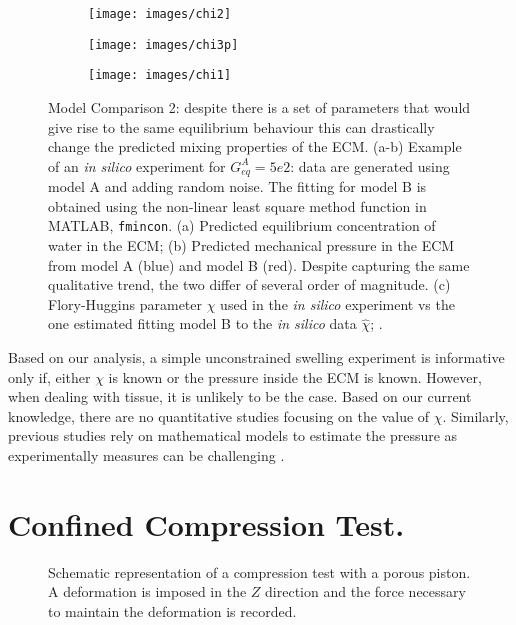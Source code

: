 \begin{figure}[h]
	\begin{subfigure}{0.49\textwidth}
		\centering
		\texttt{[image: images/chi2]}
		\caption{}
		\label{freeA}
	\end{subfigure}	
	\begin{subfigure}{0.49\textwidth}
		\centering
		\texttt{[image: images/chi3p]}
		\caption{}
		\label{freeB}
	\end{subfigure}	
	
	\centering
	\begin{subfigure}{0.6\textwidth}
		\texttt{[image: images/chi1]}
		\caption{}
		\label{freeC}
	\end{subfigure}
	\caption{Model Comparison 2: despite there is a set of parameters that would give rise to the same equilibrium behaviour this can drastically change the predicted mixing properties of the ECM. (a-b) Example of an \textit{in silico} experiment for $G^A_{eq}=5e2$: data are generated using model A and adding random noise. The fitting for model B is obtained using the non-linear least square method function in MATLAB, \texttt{fmincon}. (a) Predicted equilibrium concentration of water in the ECM; (b) Predicted mechanical pressure in the ECM from model A (blue) and model B (red). Despite capturing the same qualitative trend, the two differ of several order of magnitude. (c) Flory-Huggins parameter $\chi$ used in the \textit{in silico} experiment vs the one estimated fitting model B to the \textit{in silico} data $\hat{\chi}$; .}
	\label{figfree2}
\end{figure}

Based on our analysis, a simple unconstrained swelling experiment is informative only if, either $\chi$ is known or the pressure inside the ECM is known. However, when dealing with tissue, it is unlikely to be the case. Based on our current knowledge, there are no quantitative studies focusing on the value of $\chi$. Similarly, previous studies rely on mathematical models to estimate the pressure as experimentally measures can be challenging \cite{pressure,ecm1,ecm2}. 
\section{Confined Compression Test.}

\begin{figure}[h]
	\centering
	\def\svgwidth{0.89\linewidth}
	
	\vspace{2mm}
	\caption{Schematic representation of a compression test with a porous piston. A deformation is imposed in the $Z$ direction and the force necessary to maintain the deformation is recorded. }
\end{figure}

